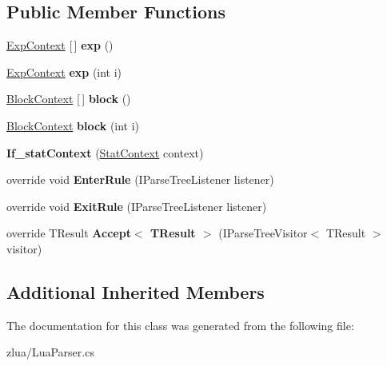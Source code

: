 \subsection*{Public Member Functions}
\begin{DoxyCompactItemize}
\item 
\mbox{\label{classzlua_1_1_lua_parser_1_1_if__stat_context_a0da79211b10ac5ee2bfcb765928d1acc}} 
\mbox{\hyperlink{classzlua_1_1_lua_parser_1_1_exp_context}{Exp\+Context}} \mbox{[}$\,$\mbox{]} {\bfseries exp} ()
\item 
\mbox{\label{classzlua_1_1_lua_parser_1_1_if__stat_context_a304e6c662af48191688282f906caa73b}} 
\mbox{\hyperlink{classzlua_1_1_lua_parser_1_1_exp_context}{Exp\+Context}} {\bfseries exp} (int i)
\item 
\mbox{\label{classzlua_1_1_lua_parser_1_1_if__stat_context_ae6753b67c59fbf3f07fc0edc45041bb8}} 
\mbox{\hyperlink{classzlua_1_1_lua_parser_1_1_block_context}{Block\+Context}} \mbox{[}$\,$\mbox{]} {\bfseries block} ()
\item 
\mbox{\label{classzlua_1_1_lua_parser_1_1_if__stat_context_aea069f59d24bbb1d00d473451e14b3cb}} 
\mbox{\hyperlink{classzlua_1_1_lua_parser_1_1_block_context}{Block\+Context}} {\bfseries block} (int i)
\item 
\mbox{\label{classzlua_1_1_lua_parser_1_1_if__stat_context_a53d7baaaa3a1dacf428b67c14c57246f}} 
{\bfseries If\+\_\+stat\+Context} (\mbox{\hyperlink{classzlua_1_1_lua_parser_1_1_stat_context}{Stat\+Context}} context)
\item 
\mbox{\label{classzlua_1_1_lua_parser_1_1_if__stat_context_ac6693fa0843352feee5fe2438d02e588}} 
override void {\bfseries Enter\+Rule} (I\+Parse\+Tree\+Listener listener)
\item 
\mbox{\label{classzlua_1_1_lua_parser_1_1_if__stat_context_ad6879a4f8782a9d074ff8fb7fce9ed61}} 
override void {\bfseries Exit\+Rule} (I\+Parse\+Tree\+Listener listener)
\item 
\mbox{\label{classzlua_1_1_lua_parser_1_1_if__stat_context_a5501fb0f4d586bb671b61290b7efa4e3}} 
override T\+Result {\bfseries Accept$<$ T\+Result $>$} (I\+Parse\+Tree\+Visitor$<$ T\+Result $>$ visitor)
\end{DoxyCompactItemize}
\subsection*{Additional Inherited Members}


The documentation for this class was generated from the following file\+:\begin{DoxyCompactItemize}
\item 
zlua/Lua\+Parser.\+cs\end{DoxyCompactItemize}

